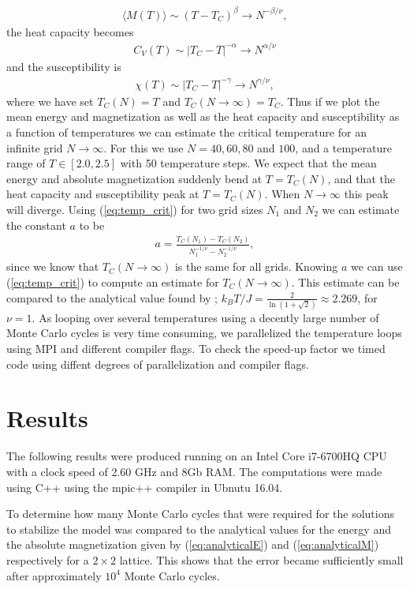 \documentclass[twocolumn]{aastex62}
\begin{document}
\begin{align}\label{eq:thermoquantM}
	\langle M(T)\rangle \sim (T - T_C)^\beta \to N^{-\beta/\nu},
\end{align}
the heat capacity becomes 
\begin{align}\label{eq:thermoquantCV}
	C_V(T) \sim |T_C - T|^{-\alpha}\to N^{\alpha / \nu}
\end{align}
and the susceptibility is 
\begin{align}\label{eq:thermoquantchi}
	\chi(T)\sim |T_C - T|^{-\gamma} \to N^{\gamma/\nu},
\end{align}
where we have set $T_C(N) = T$ and $T_C(N\to\infty) = T_C$.
Thus if we plot the mean energy and magnetization as well as the heat capacity
and susceptibility as a function of temperatures we can estimate the critical
temperature for an infinite grid $N\to \infty$. For this we use $N = 40, 60, 80$
and $100$, and a temperature range of $T\in[2.0, 2.5]$ with 50 temperature steps. We expect that the mean energy
and absolute magnetization suddenly bend at $T = T_C(N)$, and that the heat
capacity and susceptibility peak at $T = T_C(N)$. When $N\to\infty$ this peak
will diverge. Using (\ref{eq:temp_crit}) for two grid sizes $N_1$ and $N_2$ we
can estimate the constant $a$ to be
\begin{align}
	a = \frac{T_C(N_1) - T_C(N_2)}{N_1^{-1/\nu} - N_2^{-1/\nu}},
\end{align}
since we know that $T_C(N\to\infty)$ is the same for all grids. Knowing $a$ we
can use (\ref{eq:temp_crit}) to compute an estimate for $T_C(N\to\infty)$. This
estimate can be compared to the analytical value found by \cite{onsager:1944};
$k_BT/J = \frac{2}{\ln(1+\sqrt{2})}\approx 2.269$, for $\nu = 1$.
As looping over several temperatures using a decently large number of Monte
Carlo cycles is very time consuming, we parallelized the temperature loops using
MPI and different compiler flags. To check the speed-up factor we timed code using diffent
degrees of parallelization and compiler flags.


\section{Results} \label{sec:results}
The following results were produced running on an Intel Core i7-6700HQ CPU with
a clock speed of 2.60 GHz and 8Gb RAM. The computations were made using C++
using the mpic++ compiler in Ubnutu 16.04.

To determine how many Monte Carlo cycles that were required for the solutions to
stabilize the model was compared to the analytical values for the energy and
the absolute magnetization given by (\ref{eq:analyticalE}) and
(\ref{eq:analyticalM}) respectively for a $2\times 2$ lattice. This shows that the error
became sufficiently small after approximately $10^4$ Monte Carlo cycles.
\end{document}
